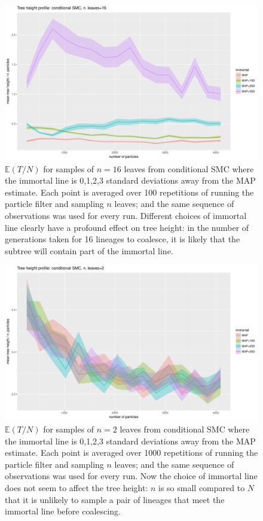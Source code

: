\documentclass{article}
\newcommand{\E}{\mathbb{E}}
\begin{document}
\begin{figure}
\centering
\includegraphics[width=\textwidth]{kalman_n16_100reps_line.pdf}
\caption{$\E(T/N)$ for samples of $n=16$ leaves from conditional SMC where the immortal line is 0,1,2,3 standard deviations away from the MAP estimate. Each point is averaged over 100 repetitions of running the particle filter and sampling $n$ leaves; and the same sequence of observations was used for every run. Different choices of immortal line clearly have a profound effect on tree height: in the number of generations taken for 16 lineages to coalesce, it is likely that the subtree will contain part of the immortal line.}
\label{fig:kalman_n16}
\end{figure}
\begin{figure}
\centering
\includegraphics[width=\textwidth]{kalman_n2_1000reps_line.pdf}
\caption{$\E(T/N)$ for samples of $n=2$ leaves from conditional SMC where the immortal line is 0,1,2,3 standard deviations away from the MAP estimate. Each point is averaged over 1000 repetitions of running the particle filter and sampling $n$ leaves; and the same sequence of observations was used for every run. Now the choice of immortal line does not seem to affect the tree height: $n$ is so small compared to $N$  that it is unlikely to sample a pair of lineages that meet the immortal line before coalescing.}
\label{fig:kalman_n2}
\end{figure}
\end{document}
